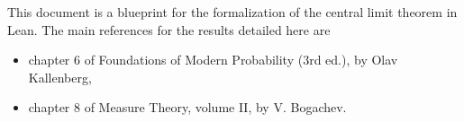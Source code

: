 
This document is a blueprint for the formalization of the central limit theorem in Lean.
The main references for the results detailed here are
\begin{itemize}
	\item chapter 6 of Foundations of Modern Probability (3rd ed.), by Olav Kallenberg,
	\item chapter 8 of Measure Theory, volume II, by V. Bogachev.
\end{itemize}





